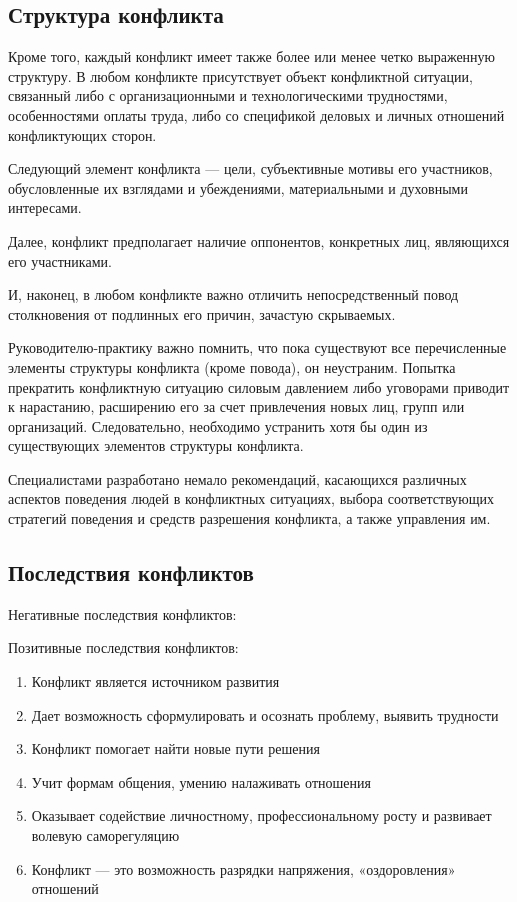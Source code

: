 \documentclass[a4paper,14pt]{extarticle}
\begin{document}
\subsection{Структура конфликта}

Кроме того, каждый конфликт имеет также более или менее четко выраженную структуру. В любом конфликте присутствует объект конфликтной ситуации, связанный либо с организационными и технологическими трудностями, особенностями оплаты труда, либо со спецификой деловых и личных отношений конфликтующих сторон.

Следующий элемент конфликта — цели, субъективные мотивы его участников, обусловленные их взглядами и убеждениями, материальными и духовными интересами.

Далее, конфликт предполагает наличие оппонентов, конкретных лиц, являющихся его участниками.

И, наконец, в любом конфликте важно отличить непосредственный повод столкновения от подлинных его причин, зачастую скрываемых.

\hfill

Руководителю-практику важно помнить, что пока существуют все перечисленные элементы структуры конфликта (кроме повода), он неустраним. Попытка прекратить конфликтную ситуацию силовым давлением либо уговорами приводит к нарастанию, расширению его за счет привлечения новых лиц, групп или организаций. Следовательно, необходимо устранить хотя бы один из существующих элементов структуры конфликта.

Специалистами разработано немало рекомендаций, касающихся различных аспектов поведения людей в конфликтных ситуациях, выбора соответствующих стратегий поведения и средств разрешения конфликта, а также управления им.

\subsection{Последствия конфликтов}

Негативные последствия конфликтов:

\begin{multienumerate}
\end{multienumerate}

Позитивные последствия конфликтов:

\begin{enumerate}
    \item Конфликт является источником развития
    \item Дает возможность сформулировать и осознать проблему, выявить трудности
    \item Конфликт помогает найти новые пути решения
    \item Учит формам общения, умению налаживать отношения
    \item Оказывает содействие личностному, профессиональному росту и развивает волевую саморегуляцию
    \item Конфликт — это возможность разрядки напряжения, «оздоровления» отношений
\end{enumerate}
\end{document}
